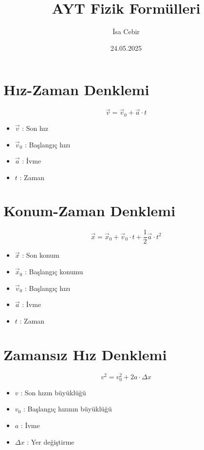 \documentclass[a4paper, 11pt, titlepage]{article}
\title{AYT Fizik Formülleri}
\author{İsa Cebir}
\date{24.05.2025}
\begin{document}
\pagestyle{fancy}
\maketitle
\thispagestyle{empty}
\fancyhf{} 
\fancyfoot[R]{\thepage}
\renewcommand{\headrulewidth}{0.2pt}
\renewcommand{\footrulewidth}{0.2pt}

\twocolumn

\tableofcontents
\newpage
\twocolumn

\section{Hız-Zaman Denklemi}
\[
\vec{v} = \vec{v}_0 + \vec{a} \cdot t
\]
\begin{itemize}
  \item $\vec{v}$ : Son hız
  \item $\vec{v}_0$ : Başlangıç hızı
  \item $\vec{a}$ : İvme
  \item $t$ : Zaman
\end{itemize}

\section{Konum-Zaman Denklemi}
\[
\vec{x} = \vec{x}_0 + \vec{v}_0 \cdot t + \frac{1}{2} \vec{a} \cdot t^2
\]
\begin{itemize}
  \item $\vec{x}$ : Son konum
  \item $\vec{x}_0$ : Başlangıç konumu
  \item $\vec{v}_0$ : Başlangıç hızı
  \item $\vec{a}$ : İvme
  \item $t$ : Zaman
\end{itemize}

\section{Zamansız Hız Denklemi}
\[
v^2 = v_0^2 + 2a \cdot \Delta x
\]
\begin{itemize}
  \item $v$ : Son hızın büyüklüğü
  \item $v_0$ : Başlangıç hızının büyüklüğü
  \item $a$ : İvme
  \item $\Delta x$ : Yer değiştirme
\end{itemize}
\end{document}
